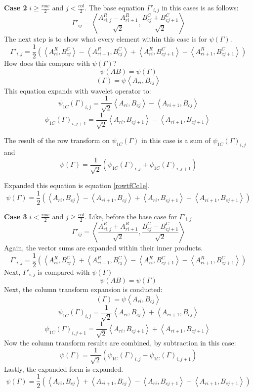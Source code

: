 \textbf{Case 2} $i \geq \frac{row}{2}$ and $j <  \frac{col}{2}$.
The base equation $\Gamma'_{i,j}$ in this cases is as follows:
\[ \Gamma'_{ij} = \left\langle \frac {A^R_{ri,j} - A^R_{ri+1}}{\sqrt{2}} , \frac {B^C_{cj} + B^C_{cj + 1}}{\sqrt{2}} \right\rangle  \]
The next step is to show what every element within this case is for $\psi(\Gamma)$.  
\[ \Gamma'_{i,j} = \frac{1}{2} ( \left\langle A^R_{ri}, B^C_{cj}   \right\rangle -   \left\langle A^R_{ri+1}, B^C_{cj}   \right\rangle +  \left\langle A^R_{ri}, B^C_{cj + 1}   \right\rangle -  \left\langle A^R_{ri+1}, B^C_{cj+1}   \right\rangle    ) \]
How does this compare with $\psi (\Gamma)$?
\[ \psi (A B)  = \psi (\Gamma)    \]
\[ (\Gamma) = \psi  \left\langle A_{ri} , B_{cj}  \right\rangle \]
This equation expands with wavelet operator to:
\[ \psi_{1C} (\Gamma)_{i,j} = \frac{1}{\sqrt{2}} \left\langle A_{ri} , B_{cj}  \right\rangle - \left\langle A_{ri +1} , B_{cj}  \right\rangle   \]
\[ \psi_{1C} (\Gamma)_{i,j+1} = \frac{1}{\sqrt{2}} \left\langle A_{ri} , B_{cj+1}  \right\rangle - \left\langle A_{ri +1} , B_{cj+1}  \right\rangle \  \]

The result of the row transform on $\psi_{1C}(\Gamma)$ in this case is a sum of $\psi_{1C}(\Gamma)_{i,j}$ and 
\[ \psi(\Gamma) = \frac{1}{\sqrt {2}} (\psi_{1C} (\Gamma)_{i,j} + \psi_{1C} (\Gamma)_{i,j+1}   ) \]

 Expanded this equation is equation \ref{rowtfCc1e}.
\[ \psi(\Gamma) = \frac{1}{2} (  \left\langle A_{ri} , B_{cj}  \right\rangle - \left\langle A_{ri +1} , B_{cj}  \right\rangle + \left\langle A_{ri} , B_{cj+1}  \right\rangle - \left\langle A_{ri +1} , B_{cj+1}  \right\rangle   ) \]

\textbf {Case 3} $i < \frac {row}{2}$ and $j \ge \frac{col}{2}$.
Like, before the base case for $\Gamma'_{i,j}$
\[ \Gamma'_{ij} = \left\langle \frac {A^R_{ri,j} + A^R_{ri+1}}{\sqrt{2}} , \frac {B^C_{cj} - B^C_{cj + 1}}{\sqrt{2}} \right\rangle  \]
Again, the vector sums are expanded within their inner products.  
\[ \Gamma'_{i,j} = \frac{1}{2} ( \left\langle A^R_{ri}, B^C_{cj}   \right\rangle +   \left\langle A^R_{ri+1}, B^C_{cj}   \right\rangle -  \left\langle A^R_{ri}, B^C_{cj + 1}   \right\rangle -  \left\langle A^R_{ri+1}, B^C_{cj+1}   \right\rangle    ) \]
Next, $\Gamma'_{i,j}$ is compared with $\psi(\Gamma)$
\[ \psi (A B)  = \psi (\Gamma)    \]
Next, the column transform expansion is conducted:
\[ (\Gamma) = \psi  \left\langle A_{ri} , B_{cj}  \right\rangle \]
\[ \psi_{1C} (\Gamma)_{i,j} = \frac{1}{\sqrt{2}} \left\langle A_{ri} , B_{cj}  \right\rangle + \left\langle A_{ri +1} , B_{cj}  \right\rangle   \]
\[ \psi_{1C} (\Gamma)_{i,j+1} = \frac{1}{\sqrt{2}} \left\langle A_{ri} , B_{cj+1}  \right\rangle + \left\langle A_{ri +1} , B_{cj+1}  \right\rangle \  \]
Now the column transform results are combined, by subtraction in this case:
\[ \psi(\Gamma) = \frac{1}{\sqrt {2}} (\psi_{1C} (\Gamma)_{i,j} - \psi_{1C} (\Gamma)_{i,j+1}   ) \]
Lastly, the expanded form is expanded.
\[ \psi(\Gamma) = \frac{1}{2} (  \left\langle A_{ri} , B_{cj}  \right\rangle + \left\langle A_{ri +1} , B_{cj}  \right\rangle - \left\langle A_{ri} , B_{cj+1}  \right\rangle - \left\langle A_{ri +1} , B_{cj+1}  \right\rangle   ) \]

